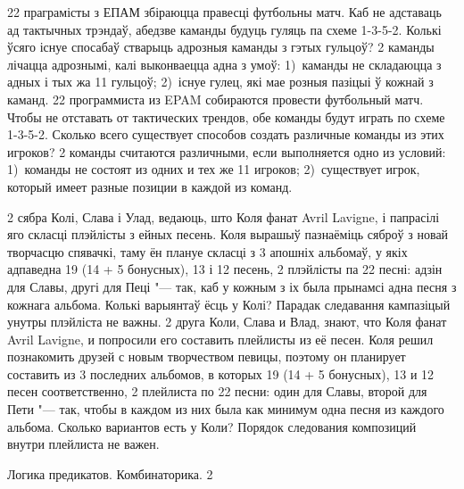 \documentclass[12pt, a4paper]{article}
\begin{document}
\begin{problemList}
\bigskip

\problemItemSimple
{22 праграмісты з ЕПАМ збіраюцца правесці футбольны матч.
Каб не адставаць ад тактычных трэндаў, абедзве каманды будуць гуляць па схеме 1-3-5-2.
Колькі ўсяго існуе спосабаў стварыць адрозныя каманды з гэтых гульцоў?
2 каманды лічацца адрознымі, калі выконваецца адна з умоў:
1)~каманды не складаюцца з адных і тых жа 11 гульцоў;
2)~існуе гулец, які мае розныя пазіцыі ў кожнай з каманд.}
{22 программиста из EPAM собираются провести футбольный матч.
Чтобы не отставать от тактических трендов, обе команды будут играть по схеме 1-3-5-2.
Сколько всего существует способов создать различные команды из этих игроков?
2 команды считаются различными, если выполняется одно из условий:
1)~команды не состоят из одних и тех же 11 игроков;
2)~существует игрок, который имеет разные позиции в каждой из команд.}

\bigskip

\problemItemSimple
{2 сябра Колі, Слава і Улад, ведаюць, што Коля фанат Avril Lavigne, і папрасілі яго скласці плэйлісты з ейных песень.
Коля вырашыў пазнаёміць сяброў з новай творчасцю спявачкі, таму ён плануе скласці з 3 апошніх альбомаў,
у якіх адпаведна 19 (14 + 5 бонусных), 13 і 12 песень, 2 плэйлісты па 22 песні: адзін для Славы, другі для Пеці "--- так,
каб у кожным з іх была прынамсі адна песня з кожнага альбома.
Колькі варыянтаў ёсць у Колі? Парадак следавання кампазіцый унутры плэйліста не важны.}
{2 друга Коли, Слава и Влад, знают, что Коля фанат Avril Lavigne, и попросили его составить плейлисты из её песен.
Коля решил познакомить друзей с новым творчеством певицы, поэтому он планирует составить из 3 последних альбомов,
в которых 19 (14 + 5 бонусных), 13 и 12 песен соответственно, 2 плейлиста по 22 песни: один для Славы, второй для Пети "--- так,
чтобы в каждом из них была как минимум одна песня из каждого альбома.
Сколько вариантов есть у Коли? Порядок следования композиций внутри плейлиста не важен.}

\end{problemList}
    
\newpage 

{Логика предикатов. Комбинаторика.}
{2}
\end{document}
